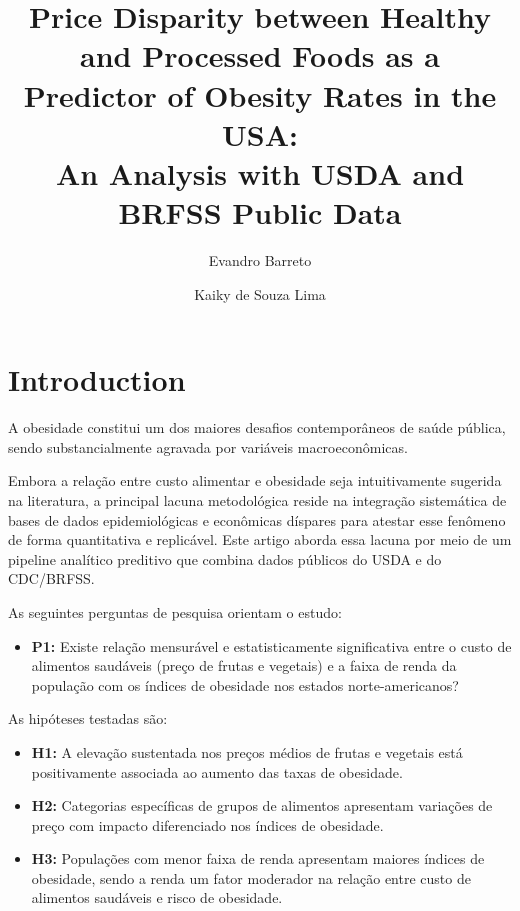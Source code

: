 \documentclass[kdmile,a4paper]{kdmile}
\title{Price Disparity between Healthy and Processed Foods as a\\
       Predictor of Obesity Rates in the USA:\\
       An Analysis with USDA and BRFSS Public Data}
\author{Evandro Barreto\inst{1} \and Kaiky de Souza Lima\inst{1}}
\institute{
  Universidade Tecnológica Federal do Paran\'{a}, Brazil \\
  \email{\{evandrobarreto, kaiky\}@alunos.utfpr.edu.br}
}
\begin{document}
\begin{bottomstuff}
\end{bottomstuff}
\maketitle

\section{Introduction}

A obesidade constitui um dos maiores desafios contemporâneos de saúde pública, sendo
substancialmente agravada por variáveis macroeconômicas.

Embora a relação entre custo alimentar e obesidade seja intuitivamente sugerida na
literatura, a principal lacuna metodológica reside na integração sistemática de bases de
dados epidemiológicas e econômicas díspares para atestar esse fenômeno de forma
quantitativa e replicável. Este artigo aborda essa lacuna por meio de um pipeline analítico
preditivo que combina dados públicos do USDA e do CDC/BRFSS.

As seguintes perguntas de pesquisa orientam o estudo:

\begin{itemize}
  \item \textbf{P1:} Existe relação mensurável e estatisticamente significativa entre o
  custo de alimentos saudáveis (preço de frutas e vegetais) e a faixa de renda da
  população com os índices de obesidade nos estados norte-americanos?
\end{itemize}

As hipóteses testadas são:
\begin{itemize}
  \item \textbf{H1:} A elevação sustentada nos preços médios de frutas e vegetais está
  positivamente associada ao aumento das taxas de obesidade.
  \item \textbf{H2:} Categorias específicas de grupos de alimentos apresentam variações de
  preço com impacto diferenciado nos índices de obesidade.
  \item \textbf{H3:} Populações com menor faixa de renda apresentam maiores índices de
  obesidade, sendo a renda um fator moderador na relação entre custo de alimentos
  saudáveis e risco de obesidade.
\end{itemize}
\end{document}
